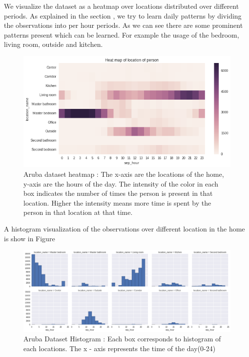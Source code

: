 We visualize the dataset as a heatmap over locations distributed over different periods. As explained in the section , we try to learn daily patterns by dividing the observations into per hour periods. As we can see there are some prominent patterns present which can be learned. For example the usage of the bedroom, living room, outside and kitchen.

\begin{figure}[htp]
\centering
\includegraphics[width=\textwidth]{images/aruba-data.png}
\caption[Aruba dataset heatmap]{Aruba dataset heatmap : The x-axis are the locations of the home, y-axis are the hours of the day. The intensity of the color in each box indicates the number of times the person is present in that location. Higher the intensity means more time is spent by the person in that location at that time.}
\label{aruba-visual}
\end{figure}

A histogram visualization of the observations over different location in the home is show in Figure \cite{aruba-hist}

\begin{figure}[htp]
\centering
\includegraphics[width=\textwidth]{images/aruba-hist.png}
\caption[Aruba dataset histogram]{Aruba Dataset Histogram : Each box corresponds to histogram of each locations. The x - axis represents the time of the day(0-24) }
\label{aruba-hist}
\end{figure}


